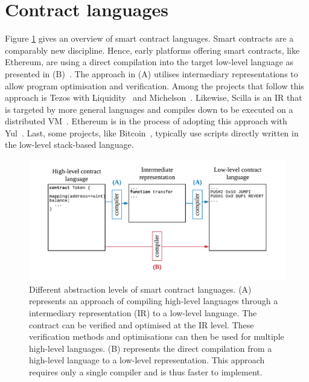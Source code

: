 \section{Contract languages}
\label{languages}

Figure \ref{fig:languagediagram} gives an overview of smart contract languages.
Smart contracts are a comparably new discipline.
Hence, early platforms offering smart contracts, like Ethereum, are using a direct compilation into the target low-level language as presented in (B)~\cite{Ethereum2018Solidity,Ethereum2018Vyper}.
The approach in (A) utilises intermediary representations to allow program optimisation and verification. 
Among the projects that follow this approach is Tezos with Liquidity~\cite{OCamlProSAS2018} and Michelson~\cite{DynamicLedgerSolutions2017}. 
Likewise, Scilla is an IR that is targeted by more general languages and compiles down to be executed on a distributed VM~\cite{Sergey2018}.
Ethereum is in the process of adopting this approach with Yul~\cite{EthereumFoundation2018IULIA}.
Last, some projects, like Bitcoin~\cite{BitcoinWiki2018Script}, typically use scripts directly written in the low-level stack-based language.




\begin{figure}[!t]
\normalsize
\centering
\includegraphics[width=\columnwidth]{fig/Language.pdf}
\caption{Different abstraction levels of smart contract languages. (A) represents an approach of compiling high-level languages through a intermediary representation (IR) to a low-level language. The contract can be verified and optimised at the IR level. These verification methods and optimisations can then be used for multiple high-level languages. (B) represents the direct compilation from a high-level language to a low-level representation. This approach requires only a single compiler and is thus faster to implement.}
\label{fig:languagediagram}
\end{figure}


